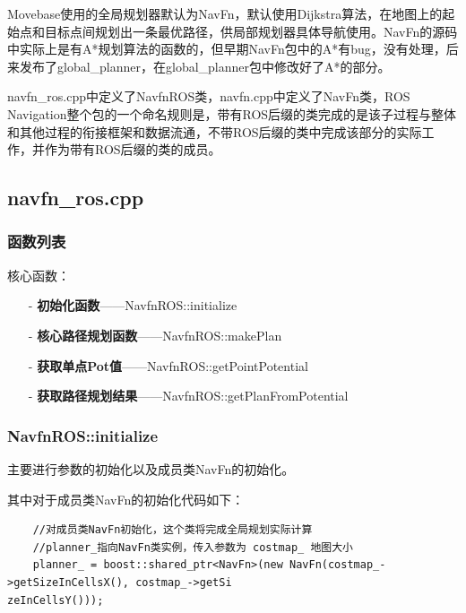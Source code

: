 \documentclass[9pt, oneside]{book}
\begin{document}

Movebase使用的全局规划器默认为NavFn，默认使用Dijkstra算法，在地图上的起始点和目标点间规划出一条最优路径，供局部规划器具体导航使用。NavFn的源码中实际上是有A*规划算法的函数的，但早期NavFn包中的A*有bug，没有处理，后来发布了global\_planner，在global\_planner包中修改好了A*的部分。

navfn\_ros.cpp中定义了NavfnROS类，navfn.cpp中定义了NavFn类，ROS Navigation整个包的一个命名规则是，带有ROS后缀的类完成的是该子过程与整体和其他过程的衔接框架和数据流通，不带ROS后缀的类中完成该部分的实际工作，并作为带有ROS后缀的类的成员。

\subsection{navfn\_ros.cpp}

\subsubsection{函数列表}

核心函数：
\begin{itemize}
    \item [-] \textbf{初始化函数}——NavfnROS::initialize
    \item [-] \textbf{核心路径规划函数}——NavfnROS::makePlan
    \item [-] \textbf{获取单点Pot值}——NavfnROS::getPointPotential
    \item [-] \textbf{获取路径规划结果}——NavfnROS::getPlanFromPotential
\end{itemize}
    
\subsubsection{NavfnROS::initialize}

主要进行参数的初始化以及成员类NavFn的初始化。

其中对于成员类NavFn的初始化代码如下：

\small
\begin{verbatim}
    //对成员类NavFn初始化，这个类将完成全局规划实际计算
    //planner_指向NavFn类实例，传入参数为 costmap_ 地图大小
    planner_ = boost::shared_ptr<NavFn>(new NavFn(costmap_->getSizeInCellsX(), costmap_->getSi
zeInCellsY()));
\end{verbatim}
\normalsize
\end{document}
